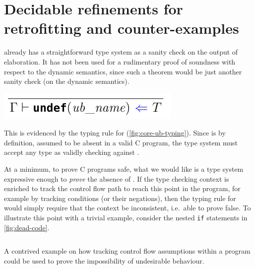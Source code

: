 \section{Decidable refinements for retrofitting and counter-examples}

 already has a straightforward  type system as a
sanity check on the output of elaboration. It has not been used for a
rudimentary proof of soundness with respect to the dynamic semantics, since
such a theorem would be just another sanity check (on the dynamic semantics).

\begin{marginfigure}
    \centering
    \includegraphics{figures/core-ub-typing}
    \caption{Typing rule for the  pure expression as %
        mentioned in \textcite{memarian2022cerberus}. The type system is set up
        in a  way, with checking judgements represented by
        $\color{blue}{\Leftarrow}$, and synthesis with
        $\color{red}{\Rightarrow}$.}\label{fig:core-ub-typing}
\end{marginfigure}

This is evidenced by the typing rule for  %
(\cref{fig:core-ub-typing}). Since  is by definition, assumed to be
absent in a valid C program, the type system must accept any type as validly
checking against . %

At a minimum, to prove C programs safe, what we would like is a type system
expressive enough to \emph{prove} the absence of . If the type checking
context is enriched to track the control flow path to reach this point in the
program, for example by tracking conditions (or their negations), then the
typing rule for  would simply require that the context %
be inconsistent, i.e.\ able to prove false. To illustrate this point with
a trivial example, consider the nested \texttt{if} statements in
\cref{fig:dead-code}.

\begin{marginfigure}
    \inputminted[breaklines,mathescape,fontsize=\small]{py}{code/dead_code.py}
    \caption{A contrived example on how tracking control flow assumptions
        within a program could be used to prove the impossibility of
        undesirable behaviour.}\label{fig:dead-code}
\end{marginfigure}

